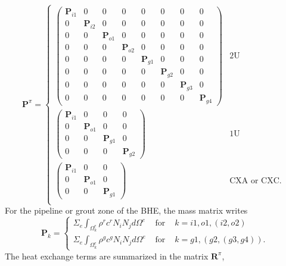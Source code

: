 \begin{equation}
\bm{P}^\pi = \left\{ \begin{array}{ll}
\left( \begin{array}{cccccccc}
\bm{P}_{i1} & 0 & 0 & 0 & 0 & 0 & 0 & 0 \\
0 & \bm{P}_{i2} & 0 & 0 & 0 & 0 & 0 & 0 \\
0 & 0 & \bm{P}_{o1} & 0 & 0 & 0 & 0 & 0 \\
0 & 0 & 0 & \bm{P}_{o2} & 0 & 0 & 0 & 0 \\
0 & 0 & 0 & 0 & \bm{P}_{g1} & 0 & 0 & 0 \\
0 & 0 & 0 & 0 & 0 & \bm{P}_{g2} & 0 & 0 \\
0 & 0 & 0 & 0 & 0 & 0 & \bm{P}_{g3} & 0 \\
0 & 0 & 0 & 0 & 0 & 0 & 0 & \bm{P}_{g4} \end{array} \right)
  & \mbox{2U} \\
\left( \begin{array}{cccc}
\bm{P}_{i1} & 0 & 0 & 0  \\
0 & \bm{P}_{o1} & 0 & 0  \\
0 & 0 & \bm{P}_{g1} & 0  \\
0 & 0 & 0 & \bm{P}_{g2}  \end{array} \right)
 & \mbox{1U} \\
\left( \begin{array}{ccc}
\bm{P}_{i1} & 0 & 0  \\
0 & \bm{P}_{o1} & 0  \\
0 & 0 & \bm{P}_{g1}  \end{array} \right)
 & \mbox{CXA or CXC. } \\
       \end{array} \right.
\end{equation}
For the pipeline or grout zone of the BHE, the mass matrix writes
\begin{equation}
\bm{P}_k = \left\{ \begin{array}{rcl}
\Sigma_{e} \int_{\Omega_k^e} \rho^r c^r N_i N_j d\Omega^e 
   &\mbox{~for~}& k = i1, o1, (i2, o2) \\
\Sigma_{e} \int_{\Omega_k^e} \rho^g c^g N_i N_j d\Omega^e 
   &\mbox{~for~}& k = g1, (g2, (g3, g4)). 
       \end{array} \right.
\end{equation}
The heat exchange terms are summarized in the matrix $\bm{R}^\pi$, 
